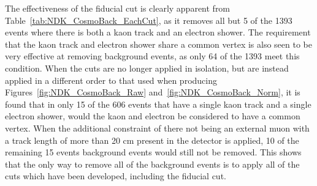 \begin{table}
  \caption[The number of events which could mimic a $n \rightarrow K^{+} + e^{-}$ decay, when cuts are applied in isolation]
          {The number of events which could mimic a $n \rightarrow K^{+} + e^{-}$ decay, when cuts are applied in isolation. Cuts are applied after it is required that the event contains at least one kaon track and at least one electron shower. It is found that 1393 events have at least one kaon track and at least one electron shower, this is shown in the top row of the table. The fiducial cut of 2 cm is seen to remove almost all of the events considered.}
  \centering
  \label{tab:NDK_CosmoBack_EachCut}
\end{table}

The effectiveness of the fiducial cut is clearly apparent from Table~\ref{tab:NDK_CosmoBack_EachCut}, as it removes all but 5 of the 1393 events where there is both a kaon track and an electron shower. The requirement that the kaon track and electron shower share a common vertex is also seen to be very effective at removing background events, as only 64 of the 1393 meet this condition. When the cuts are no longer applied in isolation, but are instead applied in a different order to that used when producing Figures~\ref{fig:NDK_CosmoBack_Raw} and~\ref{fig:NDK_CosmoBack_Norm}, it is found that in only 15 of the 606 events that have a single kaon track and a single electron shower, would the kaon and electron be considered to have a common vertex. When the additional constraint of there not being an external muon with a track length of more than 20 cm present in the detector is applied, 10 of the remaining 15 events background events would still not be removed. This shows that the only way to remove all of the background events is to apply all of the cuts which have been developed, including the fiducial cut. \\

